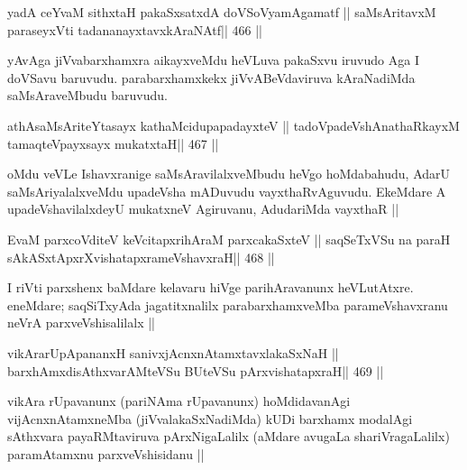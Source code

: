 \begin{shl}
yadA ceYvaM sithxtaH pakaSxsatxdA doVSoV\s yamAgamatf ||
saMsAritavxM paraseyxVti tadananayxtavxkAraNAtf\hfill || 466 ||
\end{shl}

\begin{artha}
yAvAga jiVvabarxhamxra aikayxveMdu heVLuva pakaSxvu iruvudo Aga I
doVSavu baruvudu. parabarxhamxkekx jiVvABeVdaviruva kAraNadiMda
saMsAraveMbudu baruvudu.
\end{artha}

\begin{shl}
athAsaMsAriteYtasayx kathaMcidupapadayxteV ||
tadoVpadeVshAnathaRkayxM tamaqteV\s payxsayx mukatxtaH\hfill || 467 ||
\end{shl}

\begin{artha}
oMdu veVLe Ishavxranige saMsAravilalxveMbudu heVgo hoMdabahudu, AdarU
saMsAriyalalxveMdu upadeVsha mADuvudu vayxthaRvAguvudu. EkeMdare A
upadeVshavilalxdeyU mukatxneV Agiruvanu, AdudariMda vayxthaR ||
\end{artha}




\begin{shl}
EvaM parxcoVditeV keVcitapxrihAraM parxcakaSxteV ||
saqSeTxVSu na paraH sAkASxtApxrXvishatapxrameVshavxraH\hfill || 468 ||
\end{shl}

\begin{artha}
I riVti parxshenx baMdare kelavaru hiVge parihAravanunx
heVLutAtxre. eneMdare; saqSiTxyAda jagatitxnalilx parabarxhamxveMba
parameVshavxranu neVrA parxveVshisalilalx ||
\end{artha}


\begin{shl}
vikArarUpApananxH sanivxjAcnxnAtamxtavxlakaSxNaH ||
barxhAmxdisAthxvarAMteVSu BUteVSu pArxvishatapxraH\hfill || 469 ||
\end{shl}

\begin{artha}
vikAra rUpavanunx (pariNAma rUpavanunx) hoMdidavanAgi
vijAcnxnAtamxneMba (jiVvalakaSxNadiMda) kUDi barxhamx modalAgi
sAthxvara payaRMtaviruva pArxNigaLalilx (aMdare avugaLa
shariVragaLalilx) paramAtamxnu parxveVshisidanu ||
\end{artha}

